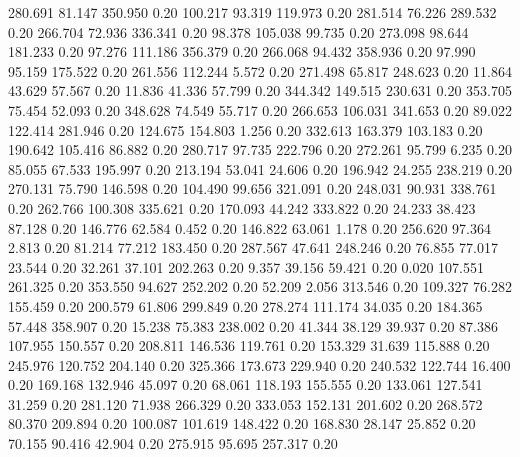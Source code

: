  280.691   81.147  350.950         0.20
 100.217   93.319  119.973         0.20
 281.514   76.226  289.532         0.20
 266.704   72.936  336.341         0.20
  98.378  105.038   99.735         0.20
 273.098   98.644  181.233         0.20
  97.276  111.186  356.379         0.20
 266.068   94.432  358.936         0.20
  97.990   95.159  175.522         0.20
 261.556  112.244    5.572         0.20
 271.498   65.817  248.623         0.20
  11.864   43.629   57.567         0.20
  11.836   41.336   57.799         0.20
 344.342  149.515  230.631         0.20
 353.705   75.454   52.093         0.20
 348.628   74.549   55.717         0.20
 266.653  106.031  341.653         0.20
  89.022  122.414  281.946         0.20
 124.675  154.803    1.256         0.20
 332.613  163.379  103.183         0.20
 190.642  105.416   86.882         0.20
 280.717   97.735  222.796         0.20
 272.261   95.799    6.235         0.20
  85.055   67.533  195.997         0.20
 213.194   53.041   24.606         0.20
 196.942   24.255  238.219         0.20
 270.131   75.790  146.598         0.20
 104.490   99.656  321.091         0.20
 248.031   90.931  338.761         0.20
 262.766  100.308  335.621         0.20
 170.093   44.242  333.822         0.20
  24.233   38.423   87.128         0.20
 146.776   62.584    0.452         0.20
 146.822   63.061    1.178         0.20
 256.620   97.364    2.813         0.20
  81.214   77.212  183.450         0.20
 287.567   47.641  248.246         0.20
  76.855   77.017   23.544         0.20
  32.261   37.101  202.263         0.20
   9.357   39.156   59.421         0.20
   0.020  107.551  261.325         0.20
 353.550   94.627  252.202         0.20
  52.209    2.056  313.546         0.20
 109.327   76.282  155.459         0.20
 200.579   61.806  299.849         0.20
 278.274  111.174   34.035         0.20
 184.365   57.448  358.907         0.20
  15.238   75.383  238.002         0.20
  41.344   38.129   39.937         0.20
  87.386  107.955  150.557         0.20
 208.811  146.536  119.761         0.20
 153.329   31.639  115.888         0.20
 245.976  120.752  204.140         0.20
 325.366  173.673  229.940         0.20
 240.532  122.744   16.400         0.20
 169.168  132.946   45.097         0.20
  68.061  118.193  155.555         0.20
 133.061  127.541   31.259         0.20
 281.120   71.938  266.329         0.20
 333.053  152.131  201.602         0.20
 268.572   80.370  209.894         0.20
 100.087  101.619  148.422         0.20
 168.830   28.147   25.852         0.20
  70.155   90.416   42.904         0.20
 275.915   95.695  257.317         0.20
